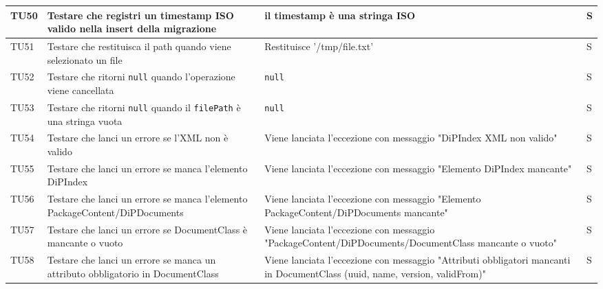 \documentclass[a4paper,12pt]{article}
\begin{document}
\begin{longtable}{|M{1.2cm}|M{5cm}|M{8cm}|M{1.5cm}|}
            TU50 & Testare che \texttt{} registri un timestamp ISO valido nella insert della migrazione & il timestamp è una stringa ISO & S \\
            \hline

            TU51 & Testare che \texttt{} restituisca il path quando viene selezionato un file & Restituisce '/tmp/file.txt' & S \\
            \hline

            TU52 & Testare che \texttt{} ritorni \texttt{null} quando l'operazione viene cancellata & \texttt{null} & S \\
            \hline

            TU53 & Testare che \texttt{} ritorni \texttt{null} quando il \texttt{filePath} è una stringa vuota & \texttt{null} & S \\
            \hline

            TU54 & Testare che \texttt{} lanci un errore se l'XML non è valido & Viene lanciata l'eccezione con messaggio "DiPIndex XML non valido" & S \\
            \hline

            TU55 & Testare che \texttt{} lanci un errore se manca l'elemento DiPIndex & Viene lanciata l'eccezione con messaggio "Elemento DiPIndex mancante" & S \\
            \hline

            TU56 & Testare che \texttt{} lanci un errore se manca l'elemento PackageContent/DiPDocuments & Viene lanciata l'eccezione con messaggio "Elemento PackageContent/DiPDocuments mancante" & S \\
            \hline

            TU57 & Testare che \texttt{} lanci un errore se DocumentClass è mancante o vuoto & Viene lanciata l'eccezione con messaggio "PackageContent/DiPDocuments/DocumentClass mancante o vuoto" & S \\
            \hline

            TU58 & Testare che \texttt{} lanci un errore se manca un attributo obbligatorio in DocumentClass & Viene lanciata l'eccezione con messaggio "Attributi obbligatori mancanti in DocumentClass (uuid, name, version, validFrom)" & S \\
            \hline


\end{longtable}
\end{document}
